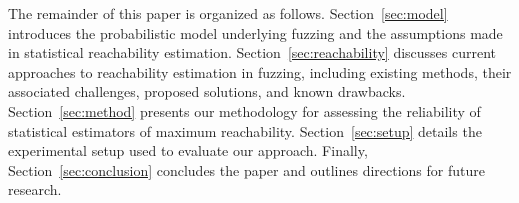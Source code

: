 The remainder of this paper is organized as follows. Section~\ref{sec:model} introduces the probabilistic model underlying fuzzing and the assumptions made in statistical reachability estimation. Section~\ref{sec:reachability} discusses current approaches to reachability estimation in fuzzing, including existing methods, their associated challenges, proposed solutions, and known drawbacks. Section~\ref{sec:method} presents our methodology for assessing the reliability of statistical estimators of maximum reachability. Section~\ref{sec:setup} details the experimental setup used to evaluate our approach. Finally, Section~\ref{sec:conclusion} concludes the paper and outlines directions for future research.
